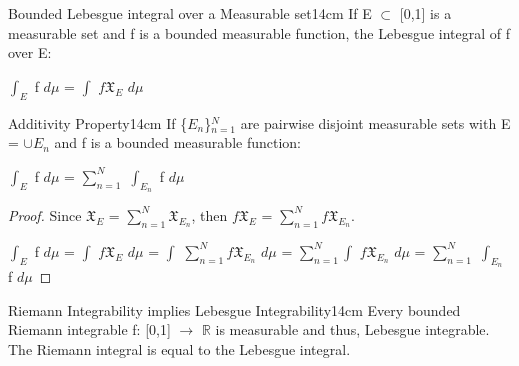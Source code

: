     \vspace{0.5cm}



    \begin{definition}{Bounded Lebesgue integral over a Measurable set}{14cm}
        If E $\subset$ [0,1] is a measurable set and f is a bounded measurable
        function, the {\color{lblue} Lebesgue integral of f over E}:

        \hspace{0.5cm}
        $\int_E$ f $d\mu$ = $\int$ $f \mathfrak{X}_E$ $d\mu$
    \end{definition}

    \vspace{0.5cm}



    \begin{wtheorem}{Additivity Property}{14cm}
        If \{$E_n$\}$_{n=1}^N$ are pairwise disjoint measurable sets
        with E = $\cup E_n$ and f is a bounded measurable function:

        \hspace{0.5cm}
        $\int_E$ f $d\mu$ = $\sum_{n=1}^N$ $\int_{E_n}$ f $d\mu$
    \end{wtheorem}

    \begin{proof}
        Since $\mathfrak{X}_E$ = $\sum_{n=1}^N \mathfrak{X}_{E_n}$,
        then $f\mathfrak{X}_E$ = $\sum_{n=1}^N f\mathfrak{X}_{E_n}$.

        \hspace{0.5cm}
        $\int_E$ f $d\mu$
        = $\int$ $f \mathfrak{X}_E$ $d\mu$
        = $\int$ $\sum_{n=1}^N f\mathfrak{X}_{E_n}$ $d\mu$
        = $\sum_{n=1}^N \int$ $f\mathfrak{X}_{E_n}$ $d\mu$
        = $\sum_{n=1}^N$ $\int_{E_n}$ f $d\mu$
    \end{proof}

    \newpage



    \begin{wtheorem}{Riemann Integrability implies Lebesgue Integrability}{14cm}
        Every bounded Riemann integrable f: [0,1] $\rightarrow$ $\mathbb{R}$
        is measurable and thus, Lebesgue integrable.
        The Riemann integral is equal to the Lebesgue integral.
    \end{wtheorem}


